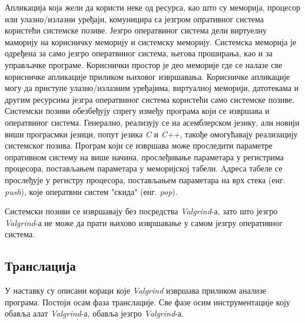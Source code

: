 \documentclass[12pt,oneside]{memoir}
\begin{document}
\indent Апликација која жели да користи неке од ресурса, као што су меморија, процесор или улазно/излазни уређаји, комуницира са језгром опративног система користећи системске позиве. Језгро оператвиног система дели виртуелну маморију на корисничку меморију и системску меморију. Системска меморија је одређена за само језгро оператвиног система, његова проширања, као и за управљачке програме. Кориснички простор је део меморије где се налазе све корисничке апликације приликом њиховог извршавања. Корисничке апликације могу да приступе улазно/излазним уређајима, виртуалној меморији, датотекама и другим ресурсима језгра оператвиног система користећи само системске позиве. Системски позиви обезбеђују спрегу између програма који се извршава и оператвиног система. Генерално, реализују се на асемблерском језику, али новији виши програсмки језици, попут језика \textit{C} и \textit{C++}, такође омогућавају реализацију системског позива. Програм који се извршава може проследити параметре опративном систему на више начина, прослеђивање параметара у регистрима процесора, постављањем параметара у меморијској табели. Aдреса табеле се прослеђује у регистру процесора, постављањем параметара на врх стека (енг. \textit{push}), које оператвни систем "скида" (енг. \textit{pop}).

\indent Системски позиви се извршавају без посредства \textit{Valgrind}-а, зато што језгро \textit{Valgrind}-а не може да прати њихово извршавање у самом језгру оперативног система.


\subsection{Транслација}

\indent У наставку су описани кораци које \textit{Valgrind} извршава приликом анализе програма. Постоји осам фаза транслације. Све фазе осим инструментације коју обавља алат \textit{Valgrind}-а, обавља језгро \textit{Valgrind}-а.
\end{document}
